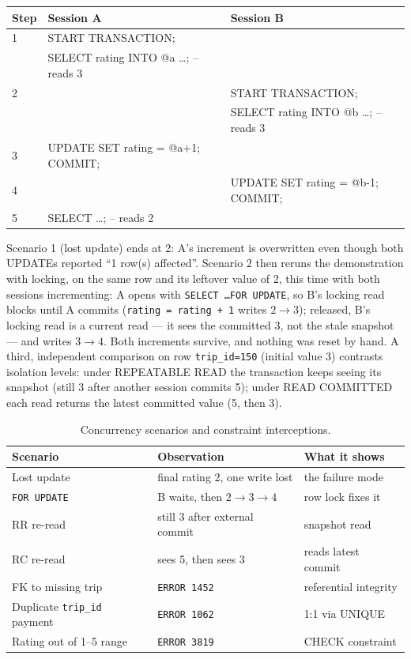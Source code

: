 {\small
\begin{tabular}{@{}lll@{}}
\toprule
Step & Session A & Session B \\
\midrule
1 & START TRANSACTION; & \\
  & SELECT rating INTO @a \ldots; -- reads 3 & \\
2 & & START TRANSACTION; \\
  & & SELECT rating INTO @b \ldots; -- reads 3 \\
3 & UPDATE SET rating = @a+1; COMMIT; & \\
4 & & UPDATE SET rating = @b-1; COMMIT; \\
5 & SELECT \ldots; -- reads 2 & \\
\bottomrule
\end{tabular}
}\vspace{4pt}
\noindent Scenario 1 (lost update) ends at 2: A's increment is overwritten even though both UPDATEs reported ``1 row(s) affected''. Scenario 2 then reruns the demonstration with locking, on the same row and its leftover value of 2, this time with both sessions incrementing: A opens with \texttt{SELECT \ldots FOR UPDATE}, so B's locking read blocks until A commits (\texttt{rating = rating + 1} writes $2\to3$); released, B's locking read is a current read --- it sees the committed 3, not the stale snapshot --- and writes $3\to4$. Both increments survive, and nothing was reset by hand. A third, independent comparison on row \texttt{trip\_id=150} (initial value 3) contrasts isolation levels: under REPEATABLE READ the transaction keeps seeing its snapshot (still 3 after another session commits 5); under READ COMMITTED each read returns the latest committed value (5, then 3).

\begin{table}[h]
\centering
\caption{Concurrency scenarios and constraint interceptions.}
\label{tab:exp3}
\small
\begin{tabular}{@{}lll@{}}
\toprule
Scenario & Observation & What it shows \\
\midrule
Lost update & final rating 2, one write lost & the failure mode \\
\texttt{FOR UPDATE} & B waits, then $2\to3\to4$ & row lock fixes it \\
RR re-read & still 3 after external commit & snapshot read \\
RC re-read & sees 5, then sees 3 & reads latest commit \\
FK to missing trip        & \texttt{ERROR 1452} & referential integrity \\
Duplicate \texttt{trip\_id} payment & \texttt{ERROR 1062} & 1:1 via UNIQUE \\
Rating out of 1--5 range  & \texttt{ERROR 3819} & CHECK constraint \\
\bottomrule
\end{tabular}
\end{table}


